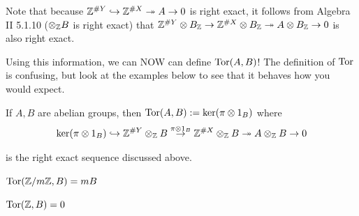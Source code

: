\documentclass[11pt,leqno,oneside]{amsart}
\numberwithin{thm}{section}
\begin{document}
Note that because ${\mathbb Z}^{\# Y} \hookrightarrow {\mathbb Z}^{\# X} \twoheadrightarrow A \to 0$ is right exact, it follows from Algebra II 5.1.10 ($\otimes_{\mathbb Z} B$ is right exact) that ${\mathbb Z}^{\# Y} \otimes B_{\mathbb Z} \to {\mathbb Z}^{\# X} \otimes B_{\mathbb Z} \twoheadrightarrow A \otimes B_{\mathbb Z} \to 0$ is also right exact.

Using this information, we can NOW can define $\operatorname{Tor}(A, B)$!  The definition of $\operatorname{Tor}$ is confusing, but look at the examples below to see that it behaves how you would expect.

\begin{defn}
  If $A, B$ are abelian groups, then $\operatorname{Tor}(A, B) := \ker(\pi \otimes 1_B)$ where
  $$\ker(\pi \otimes 1_B) \hookrightarrow {\mathbb Z}^{\# Y} \otimes_{\mathbb Z} B \overset{\pi \otimes 1_B}{\to} {\mathbb Z}^{\# X} \otimes_{\mathbb Z} B \twoheadrightarrow A \otimes_{\mathbb Z} B \to 0$$

  is the right exact sequence discussed above.
\end{defn}
\begin{example}
  $\operatorname{Tor}({\mathbb Z}/m{\mathbb Z}, B) = mB$
\end{example}
\begin{example}
  $\operatorname{Tor}({\mathbb Z}, B) = 0$
\end{example}
\end{document}
